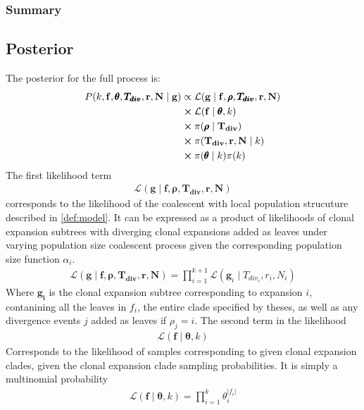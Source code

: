 \documentclass{report}
\theoremstyle{definition}
\begin{document}
\subsubsection{Summary}
\subsection{Posterior}
The posterior for the full process is:
\begin{gather}
\begin{aligned}
P(k, \mathbf{f}, \pmb{\theta}, \pmb{T_{div}}, \mathbf{r}, \mathbf{N}\mid\mathbf{g}) &\propto \mathcal{L}(\mathbf{g}\mid \mathbf{f}, \pmb{\rho}, \pmb{T_{div}}, \mathbf{r}, \mathbf{N})\\
&\cross \mathcal{L}(\mathbf{f}\mid\pmb{\theta}, k)\\
&\cross \pi(\pmb{\rho}\mid\mathbf{T_{div}})\\
&\cross \pi(\mathbf{T_{div}}, \mathbf{r}, \mathbf{N}\mid k)\\
&\cross\pi(\pmb{\theta}\mid k)\pi(k)
\end{aligned}
\end{gather}
The first likelihood term 
\begin{gather}
\mathcal{L}(\mathbf{g}\mid\mathbf{f}, \pmb{\rho}, \pmb{T_{div}}, \mathbf{r}, \mathbf{N})
\end{gather}
corresponds to the likelihood of the coalescent with local population strucuture described in \ref{def:model}. It can be expressed as a product of likelihoods of clonal expansion subtrees with diverging clonal expansions added as leaves under varying population size coalescent process given the corresponding population size function $\alpha_i$.
\begin{gather}
\mathcal{L}(\mathbf{g}\mid\mathbf{f}, \pmb{\rho}, \pmb{T_{div}}, \mathbf{r}, \mathbf{N}) = \prod\limits_{i=1}^{k+1}\mathcal{L}(\mathbf{g}_i\mid T_{div_i}, r_i, N_i)
\end{gather}
Where $\mathbf{g_i}$ is the clonal expansion subtree corresponding to expansion $i$, contanining all the leaves in $f_i$, the entire clade specified by theses, as well as any divergence events $j$ added as leaves if $\rho_j = i$.
The second term in the likelihood 
\begin{gather}
\mathcal{L}(\mathbf{f}\mid\pmb{\theta}, k)
\end{gather}
Corresponds to the likelihood of samples corresponding to given clonal expansion clades, given the clonal expansion clade sampling probabilities.
It is simply a multinomial probability
\begin{gather}
\mathcal{L}(\mathbf{f}\mid\pmb{\theta}, k) = \prod\limits_{i=1}^{k}\theta_{i}^{|f_i|}  
\end{gather}
\end{document}
